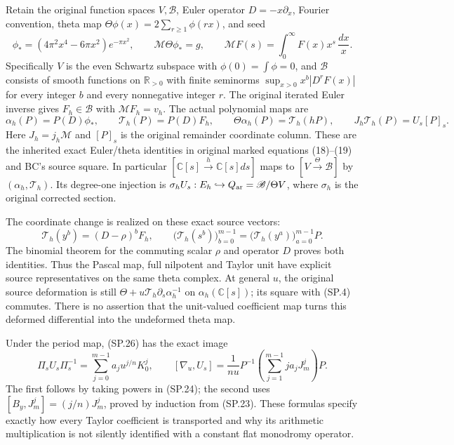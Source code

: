 Retain the original function spaces \(V,\mathscr B\), Euler
operator \(D=-x\partial_x\), Fourier convention, theta map
\(\Theta\phi(x)=2\sum_{r\ge1}\phi(rx)\), and seed
\[
 \phi_*=(4\pi^2x^4-6\pi x^2)e^{-\pi x^2},\qquad
 \mathcal M\Theta\phi_*=g,\qquad
 \mathcal MF(s)=\int_0^\infty F(x)x^s\,\frac{dx}{x}.
 \]
Specifically \(V\) is the even Schwartz subspace with
\(\phi(0)=\int\phi=0\), and \(\mathscr B\) consists of smooth
functions on \(\mathbb R_{>0}\) with finite seminorms
\(\sup_{x>0}x^b|D^rF(x)|\) for every integer \(b\) and
every nonnegative integer \(r\).
The original iterated Euler inverse gives \(F_h\in\mathscr B\)
with \(\mathcal MF_h=v_h\). The actual polynomial maps are
\[
 \alpha_h(P)=P(D)\phi_*,\qquad
 \mathcal T_h(P)=P(D)F_h,\qquad
 \Theta\alpha_h(P)=\mathcal T_h(hP),\qquad
 J_h\mathcal T_h(P)=U_s[P]_s .
 \tag{SP.27}\label{CFStage:eq:sp-source}
\]
Here \(J_h=j_h\mathcal M\) and \([P]_s\) is the original
remainder coordinate column. These are the inherited exact
Euler/theta identities in original marked equations (18)--(19)
and BC's source square. In particular
\([\mathbb C[s]\xrightarrow{h}\mathbb C[s]ds]\)
maps to \([V\xrightarrow{\Theta}\mathscr B]\) by
\((\alpha_h,\mathcal T_h)\).
Its degree-one injection is \(\sigma_hU_s:E_h\hookrightarrow
Q_{\rm ar}=\mathscr B/\Theta V\), where
\(\sigma_h\) is the original corrected section.

The coordinate change is realized on these exact source vectors:
\[
 \mathcal T_h(y^b)=(D-\rho)^bF_h,\qquad
 \bigl(\mathcal T_h(s^b)\bigr)_{b=0}^{m-1}
 =\bigl(\mathcal T_h(y^a)\bigr)_{a=0}^{m-1}P.
 \tag{SP.28}\label{CFStage:eq:sp-sourcetranslation}
\]
The binomial theorem for the commuting scalar \(\rho\) and
operator \(D\) proves both identities.
Thus the Pascal map, full nilpotent and Taylor unit have
explicit source representatives on the same theta complex.
At general \(u\), the original source deformation is still
\(\Theta+u\mathcal T_h\partial_s\alpha_h^{-1}\) on
\(\alpha_h(\mathbb C[s])\); its square with (SP.4) commutes.
There is no assertion that the unit-valued coefficient
map turns this deformed differential into the undeformed
theta map.

Under the period map, (SP.26) has the exact image
\[
 \Pi_s U_s\Pi_s^{-1}
 =\sum_{j=0}^{m-1}a_j u^{j/n}K_0^j,\qquad
 [\nabla_u,U_s]
 =\frac1{nu}P^{-1}
       \left(\sum_{j=1}^{m-1}j a_jJ_m^j\right)P.
 \tag{SP.29}\label{CFStage:eq:sp-unittransport}
\]
The first follows by taking powers in (SP.24); the second
uses \([B_y,J_m^j]=(j/n)J_m^j\), proved by induction from
(SP.23). These formulas specify exactly how every Taylor
coefficient is transported and why its arithmetic
multiplication is not silently identified with a constant
flat monodromy operator.

